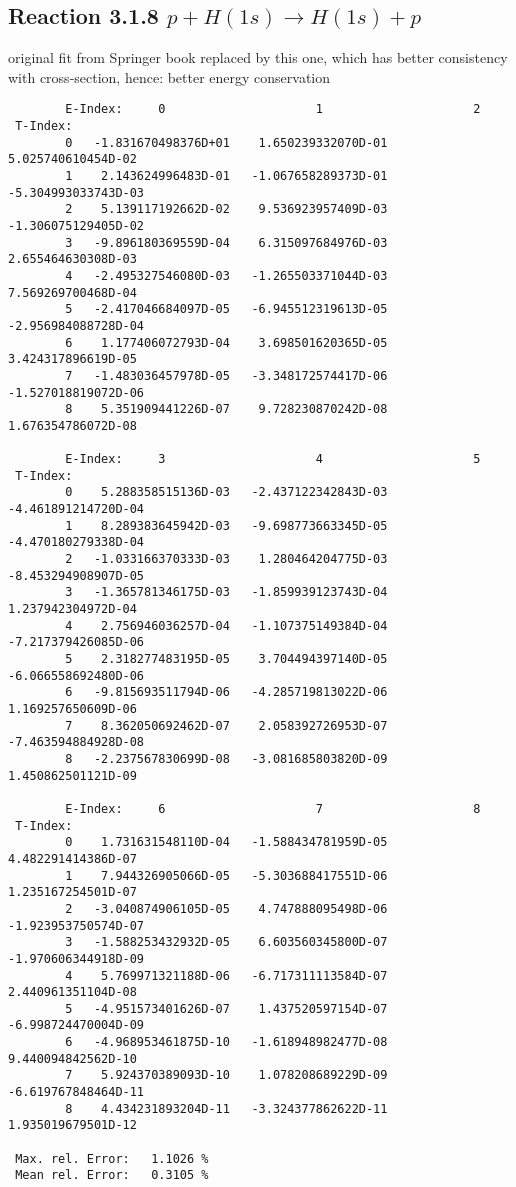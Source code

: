 \newpage
\subsection{
Reaction 3.1.8 $   p + H(1s) \rightarrow H(1s) + p$}

original fit from Springer book replaced by this one, which has better
consistency with cross-section, hence: better energy conservation

\begin{small}\begin{verbatim}
        E-Index:     0                     1                     2
 T-Index:
        0   -1.831670498376D+01    1.650239332070D-01    5.025740610454D-02
        1    2.143624996483D-01   -1.067658289373D-01   -5.304993033743D-03
        2    5.139117192662D-02    9.536923957409D-03   -1.306075129405D-02
        3   -9.896180369559D-04    6.315097684976D-03    2.655464630308D-03
        4   -2.495327546080D-03   -1.265503371044D-03    7.569269700468D-04
        5   -2.417046684097D-05   -6.945512319613D-05   -2.956984088728D-04
        6    1.177406072793D-04    3.698501620365D-05    3.424317896619D-05
        7   -1.483036457978D-05   -3.348172574417D-06   -1.527018819072D-06
        8    5.351909441226D-07    9.728230870242D-08    1.676354786072D-08

        E-Index:     3                     4                     5
 T-Index:
        0    5.288358515136D-03   -2.437122342843D-03   -4.461891214720D-04
        1    8.289383645942D-03   -9.698773663345D-05   -4.470180279338D-04
        2   -1.033166370333D-03    1.280464204775D-03   -8.453294908907D-05
        3   -1.365781346175D-03   -1.859939123743D-04    1.237942304972D-04
        4    2.756946036257D-04   -1.107375149384D-04   -7.217379426085D-06
        5    2.318277483195D-05    3.704494397140D-05   -6.066558692480D-06
        6   -9.815693511794D-06   -4.285719813022D-06    1.169257650609D-06
        7    8.362050692462D-07    2.058392726953D-07   -7.463594884928D-08
        8   -2.237567830699D-08   -3.081685803820D-09    1.450862501121D-09

        E-Index:     6                     7                     8
 T-Index:
        0    1.731631548110D-04   -1.588434781959D-05    4.482291414386D-07
        1    7.944326905066D-05   -5.303688417551D-06    1.235167254501D-07
        2   -3.040874906105D-05    4.747888095498D-06   -1.923953750574D-07
        3   -1.588253432932D-05    6.603560345800D-07   -1.970606344918D-09
        4    5.769971321188D-06   -6.717311113584D-07    2.440961351104D-08
        5   -4.951573401626D-07    1.437520597154D-07   -6.998724470004D-09
        6   -4.968953461875D-10   -1.618948982477D-08    9.440094842562D-10
        7    5.924370389093D-10    1.078208689229D-09   -6.619767848464D-11
        8    4.434231893204D-11   -3.324377862622D-11    1.935019679501D-12

 Max. rel. Error:   1.1026 %
 Mean rel. Error:   0.3105 %

\end{verbatim}\end{small}


